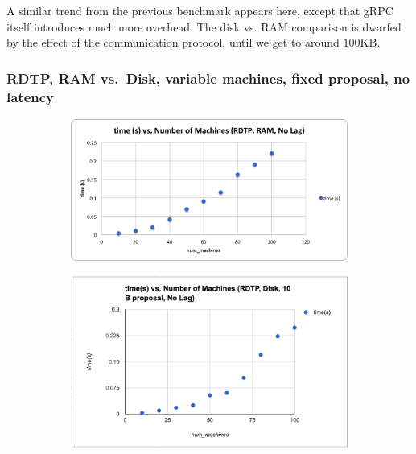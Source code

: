 \documentclass[12pt,]{article}
\begin{document}
\medskip

A similar trend from the previous benchmark appears here, except that
gRPC itself introduces much more overhead. The disk vs. RAM comparison
is dwarfed by the effect of the communication protocol, until we get to
around $100$KB.

\subsubsection{RDTP, RAM vs.~Disk, variable machines, fixed proposal, no
latency}\label{rdtp-ram-vs.disk-variable-machines-fixed-proposal-no-latency}

\begin{figure}[H]
\centering
\begin{subfigure}{.49\textwidth}
    \centering
    \includegraphics[width=1.0\textwidth]{RAM_RDTP_variable_machines_fixed_proposal_no_latency.png}
\end{subfigure}
\begin{subfigure}{.49\textwidth}
    \centering
    \includegraphics[width=1.0\textwidth]{disk_RDTP_variable_machines_fixed_proposal_no_latency.png}
\end{subfigure}
\end{figure}
\end{document}
